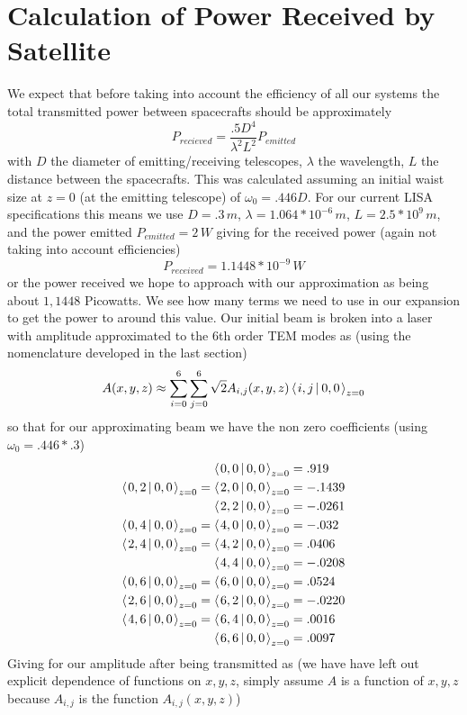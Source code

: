 \documentclass[11pt]{amsart}
\makeatletter
\newcommand{\msp}[1]{\mspace{#1mu}}		%
\newcommand{\0}{\varnothing}		%
\newcommand{\apr}{\approx}		%
\newcommand{\brac}[2]{\left\langle\msp{2} #1\left\lvert \msp{3.5} #2 \right.\right\rangle}	%
\newcommand{\1}{!}
\newcommand{\2}{@}
\newcommand{\3}{\#}
\newcommand{\4}{\$}
\newcommand{\5}{\%}
\newcommand{\6}{$^\wedge$}
\newcommand{\7}{\&}
\newcommand{\8}{*}
\newcommand{\9}{(}
\makeatother
\begin{document}
\newpage
\section{Calculation of Power Received by Satellite}
We expect that before taking into account the efficiency of all our systems the total transmitted power between spacecrafts should be approximately
\[
P_{recieved} = \frac{.5D^4}{\lambda^2L^2}P_{emitted} 
\]
with $D$ the diameter of emitting/receiving telescopes, $\lambda$ the wavelength, $L$ the distance between the spacecrafts. This was calculated assuming an initial waist size at $z=0$ (at the emitting telescope) of $\omega_0=.446D$. For our current LISA specifications this means we use $D=.3\,m$, $\lambda = 1.064*10^{-6}\,m$, $L = 2.5*10^9\,m$, and the power emitted $P_{emitted} = 2\,W$ giving for the received power (again not taking into account efficiencies)
\[
P_{received} = 1.1448*10^{-9}\, W
\]
or the power received we hope to approach with our approximation as being about $1,1448$ Picowatts. We see how many terms we need to use in our expansion to get the power to around this value. Our initial beam is broken into a laser with amplitude approximated to the 6th order TEM modes as (using the nomenclature developed in the last section)
\[
A(x,y,z) \apr \sum_{i=0}^6\sum_{j=0}^6 \sqrt{2}A_{i,j}(x,y,z)\brac{i,j}{0,0}_{z=0}
\]
so that for our approximating beam we have the non zero coefficients (using $\omega_0 = .446*.3$)
\begin{align*}
\brac{0,0}{0,0}_{z=0} &= .919
\\
\brac{0,2}{0,0}_{z=0} = \brac{2,0}{0,0}_{z=0} &= -.1439
\\
\brac{2,2}{0,0}_{z=0} &= -.0261
\\
\brac{0,4}{0,0}_{z=0} = \brac{4,0}{0,0}_{z=0} &= -.032
\\
\brac{2,4}{0,0}_{z=0} = \brac{4,2}{0,0}_{z=0}&= .0406
\\
\brac{4,4}{0,0}_{z=0} &= -.0208
\\
\brac{0,6}{0,0}_{z=0} = \brac{6,0}{0,0}_{z=0} &= .0524
\\
\brac{2,6}{0,0}_{z=0} = \brac{6,2}{0,0}_{z=0} &= -.0220
\\
\brac{4,6}{0,0}_{z=0} = \brac{6,4}{0,0}_{z=0} &= .0016
\\
\brac{6,6}{0,0}_{z=0} &= .0097
\end{align*}
Giving for our amplitude after being transmitted as (we have have left out explicit dependence of functions on $x,y,z$, simply assume $A$ is a function of $x,y,z$ because $A_{i,j}$ is the function $A_{i,j}(x,y,z)$)
\end{document}
